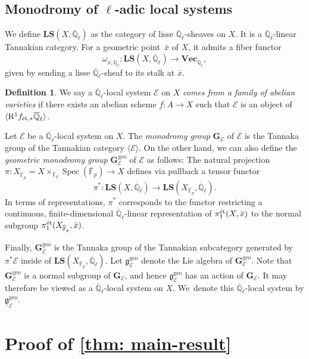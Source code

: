 \documentclass[JEP,XML,SOM,Unicode,published]{cedram}
\numberwithin{equation}{subsection}
\theoremstyle{definition}
\newtheorem{defn}[thm]{Definition}
\DeclareMathOperator\Spec{Spec}
\newcommand\Fpbar{{\overline{\mb{F}}_p}}
\newcommand{\Qlbar}{\overline{\mathbb{Q}}_{\ell}}
\newcommand{\Q}{\mathbb Q}
\let\mf\mathfrak
\let\mc\mathcal
\let\mb\mathbb
\let\mbf\mathbf
\begin{document}
\subsection{Monodromy of \texorpdfstring{$\ell$}{l}-adic local systems}
We define $\mathbf{LS}(X,\overline{\Q}_\ell)$ as the category of lisse $\overline{\Q}_\ell$-sheaves on $X$. It is a $\Qlbar$-linear Tannakian category. For a geometric point~$\bar x$ of $X$, it admits a fiber functor
\[
\omega_{\bar x,\overline{\Q}_\ell}\colon\mathbf{LS}(X,\overline{\Q}_\ell)\to\mathbf{Vec}_{\overline{\Q}_\ell},
\]
given by sending a lisse $\Qlbar$-sheaf to its stalk at $\bar x$.

\begin{defn}\label{defn: come-from-av}
We say a $\Qlbar$-local system $\mathcal{E}$ on $X$ \emph{comes from a family of abelian varieties} if there exists an abelian scheme $f\colon A\to X$ such that $\mathcal{E}$ is an object of $\langle\mathrm{R}^1f_{\textnormal{ét},\ast}\overline{\Q}_\ell\rangle$.
\end{defn}

Let $\mathcal{E}$ be a $\Qlbar$-local system on $X$. The \emph{monodromy group} $\mathbf{G}_\mathcal{E}$ of $\mathcal{E}$ is the Tannaka group of the Tannakian category $\langle\mathcal{E}\rangle$. On the other hand, we can also define the \emph{geometric monodromy group} $\mathbf{G}_\mathcal{E}^\mathrm{geo}$ of $\mathcal{E}$ as follows: The natural projection $\pi\colon X_{\Fpbar}=X\times_{\mathbb{F}_q}\Spec(\Fpbar)\to X$ defines via pullback a tensor functor
\[
\pi^\ast\colon\mathbf{LS}(X,\overline{\Q}_\ell)\to\mathbf{LS}(X_\Fpbar,\overline{\Q}_\ell).
\]
In terms of representations, $\pi^\ast$ corresponds to the functor restricting a continuous, finite-dimensional $\Qlbar$-linear representation of $\pi_1^\textnormal{ét}(X,\bar x)$ to the normal subgroup $\pi_1^\textnormal{ét}(X_\Fpbar,\bar x)$.

Finally, $\mathbf{G}_\mathcal{E}^\mathrm{geo}$ is the Tannaka group of the Tannakian subcategory generated by~$\pi^\ast\mc{E}$ inside of $\mathbf{LS}(X_\Fpbar,\overline{\Q}_\ell)$. Let $\mf{g}^{\mathrm{geo}}_{\mc{E}}$ denote the Lie algebra of $\mathbf{G}_\mathcal{E}^\mathrm{geo}$. Note that $\mbf{G}^{\mathrm{geo}}_{\mc{E}}$ is a normal subgroup of $\mbf{G}_{\mc{E}}$, and hence $\mf{g}^{\mathrm{geo}}_{\mc{E}}$ has an action of $\mbf{G}_{\mc{E}}$. It may therefore be viewed as a $\Qlbar$-local system on $X$. We~denote this $\Qlbar$-local system by $\underline{\mf{g}}^{\mathrm{geo}}_{\mc{E}}$.

\section{Proof of \texorpdfstring{\cref{thm: main-result}}{the result}}\label{sec: proof}
\end{document}
